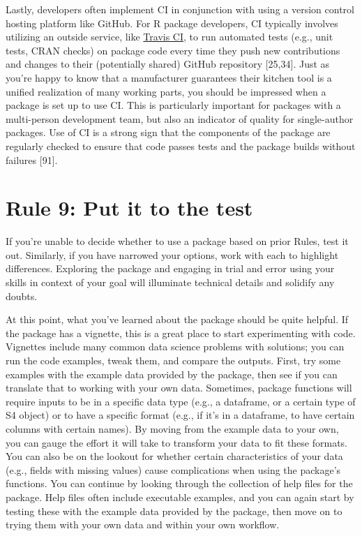 \documentclass[10pt,letterpaper]{article}
\begin{document}
Lastly, developers often implement CI in conjunction with using a
version control hosting platform like GitHub. For R package developers,
CI typically involves utilizing an outside service, like
\href{https://travis-ci.org/}{Travis CI}, to run automated tests (e.g.,
unit tests, CRAN checks) on package code every time they push new
contributions and changes to their (potentially shared) GitHub
repository {[}25,34{]}. Just as you're happy to know that a manufacturer
guarantees their kitchen tool is a unified realization of many working
parts, you should be impressed when a package is set up to use CI. This
is particularly important for packages with a multi-person development
team, but also an indicator of quality for single-author packages. Use
of CI is a strong sign that the components of the package are regularly
checked to ensure that code passes tests and the package builds without
failures {[}91{]}.

\hypertarget{rule-9-put-it-to-the-test}{%
\section{Rule 9: Put it to the test}\label{rule-9-put-it-to-the-test}}

If you're unable to decide whether to use a package based on prior
Rules, test it out. Similarly, if you have narrowed your options, work
with each to highlight differences. Exploring the package and engaging
in trial and error using your skills in context of your goal will
illuminate technical details and solidify any doubts.

At this point, what you've learned about the package should be quite
helpful. If the package has a vignette, this is a great place to start
experimenting with code. Vignettes include many common data science
problems with solutions; you can run the code examples, tweak them, and
compare the outputs. First, try some examples with the example data
provided by the package, then see if you can translate that to working
with your own data. Sometimes, package functions will require inputs to
be in a specific data type (e.g., a dataframe, or a certain type of S4
object) or to have a specific format (e.g., if it's in a dataframe, to
have certain columns with certain names). By moving from the example
data to your own, you can gauge the effort it will take to transform
your data to fit these formats. You can also be on the lookout for
whether certain characteristics of your data (e.g., fields with missing
values) cause complications when using the package's functions. You can
continue by looking through the collection of help files for the
package. Help files often include executable examples, and you can again
start by testing these with the example data provided by the package,
then move on to trying them with your own data and within your own
workflow.
\end{document}

